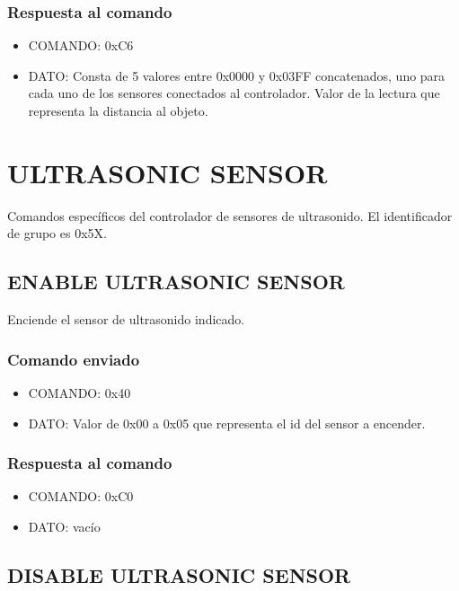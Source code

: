 \documentclass[a4paper,10pt]{article}
\begin{document}
\subsubsection*{Respuesta al comando}

\begin{itemize}
	\item{COMANDO:} 0xC6
	\item{DATO:} Consta de 5 valores entre 0x0000 y 0x03FF concatenados, uno para cada uno de los sensores conectados al controlador.
	Valor de la lectura que representa la distancia al objeto.
\end{itemize}

\section{ULTRASONIC SENSOR} 
\label{grupo_ultrasonic_sensor}

Comandos espec\'ificos del controlador de sensores de ultrasonido.
El identificador de grupo es 0x5X.

\subsection{ENABLE ULTRASONIC SENSOR}
\label{enable_ultrasonic_sensor}

Enciende el sensor de ultrasonido indicado.

\subsubsection*{Comando enviado}

\begin{itemize}
	\item{COMANDO:} 0x40
	\item{DATO:} Valor de 0x00 a 0x05 que representa el id del sensor a encender.
\end{itemize}

\subsubsection*{Respuesta al comando}

\begin{itemize}
	\item{COMANDO:} 0xC0
	\item{DATO:} vac\'io
\end{itemize}

\subsection{DISABLE ULTRASONIC SENSOR}
\label{disable_ultrasonic_sensor}
\end{document}
